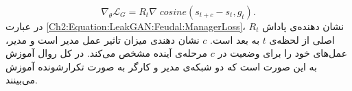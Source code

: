 \begin{equation}\label{Ch2:Equation:LeakGAN:Feudal:ManagerLoss}
\nabla_\theta \mathcal{L}_G = R_t \nabla \; cosine(s_{t+c}-s_t,g_t).
\end{equation}
در عبارت
\ref{Ch2:Equation:LeakGAN:Feudal:ManagerLoss}،
$R_t$
نشان دهنده‌ی پاداش اصلی از لحظه‌ی $t$ به بعد است. $c$ نشان دهند‌ی میزان تاثیر عمل مدیر است و مدیر، عمل‌های خود را برای  وضعیت در $c$ مرحله‌ی آینده مشخص می‌کند.
\newline
 در کل روال آموزش به این صورت است که دو شبکه‌ی مدیر و کارگر به صورت تکرارشونده آموزش می‌بینند.
